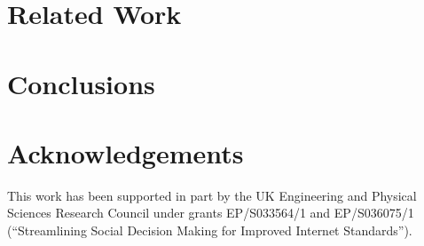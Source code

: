 \documentclass[twocolumn,10pt]{article}
\begin{document}

\section{Related Work}
\label{sec:related}

%
%



\section{Conclusions}
\label{sec:conclusions}


\section*{Acknowledgements}


This work has been supported in part by the UK Engineering and Physical
Sciences Research Council under grants EP/S033564/1 and EP/S036075/1
(``Streamlining Social Decision Making for Improved Internet Standards'').




\ifpdf
  \ifdefined\pdftrailerid
    \pdftrailerid{}
  \fi
\fi
\end{document}
